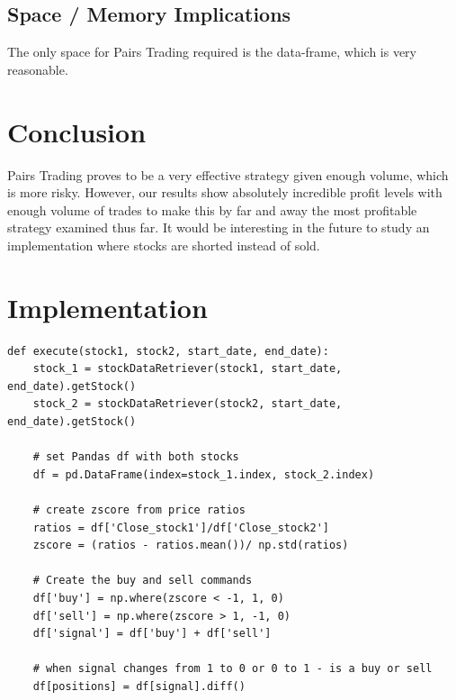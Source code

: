 \documentclass[letterpaper,11pt]{article}
\begin{document}
\subsection*{Space / Memory Implications}
The only space for Pairs Trading required is the data-frame, which is very reasonable.

\section*{Conclusion}
Pairs Trading proves to be a very effective strategy given enough volume, which is more risky. However, our results show absolutely incredible profit levels with enough volume of trades to make this by far and away the most profitable strategy examined thus far. It would be interesting in the future to study an implementation where stocks are shorted instead of sold. 

\section*{Implementation}
\begin{verbatim}
def execute(stock1, stock2, start_date, end_date):
    stock_1 = stockDataRetriever(stock1, start_date, end_date).getStock()
    stock_2 = stockDataRetriever(stock2, start_date, end_date).getStock()

    # set Pandas df with both stocks
    df = pd.DataFrame(index=stock_1.index, stock_2.index)

    # create zscore from price ratios
    ratios = df['Close_stock1']/df['Close_stock2']
    zscore = (ratios - ratios.mean())/ np.std(ratios)

    # Create the buy and sell commands
    df['buy'] = np.where(zscore < -1, 1, 0)
    df['sell'] = np.where(zscore > 1, -1, 0)
    df['signal'] = df['buy'] + df['sell']

    # when signal changes from 1 to 0 or 0 to 1 - is a buy or sell
    df[positions] = df[signal].diff()

\end{verbatim}



\end{document}
